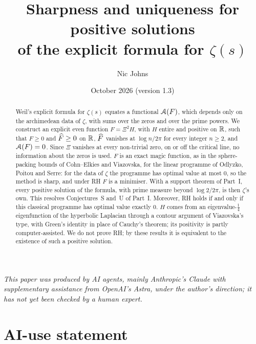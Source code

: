 \documentclass[11pt]{amsart}
\title[Sharpness and uniqueness for the explicit formula]{Sharpness and uniqueness for positive solutions\\ of the explicit formula
for $\zeta(s)$}
\author{Nic Johns}
\date{October 2026 (version 1.3)}
\theoremstyle{definition}
\theoremstyle{remark}
\numberwithin{equation}{section}
\newcommand{\inputsection}[1]{}
\begin{document}
\begin{abstract}
Weil's explicit formula for $\zeta(s)$ equates a functional $\mathcal A(F)$, which depends only on the archimedean data of $\zeta$, with sums over
the zeros and over the prime powers. We construct an explicit even function $F=\Xi^2H$, with $H$ entire and positive on $\mathbb R$, such that
$F\ge0$ and $\widehat F\ge0$ on $\mathbb R$, $\widehat F$ vanishes at $\log n/2\pi$ for every integer $n\ge2$, and $\mathcal A(F)=0$. Since $\Xi$ vanishes at every
non-trivial zero, on or off the critical line, no information about the zeros is used. $F$ is an exact magic function, as in the
sphere-packing bounds of Cohn--Elkies and Viazovska, for the linear programme of Odlyzko, Poitou and Serre: for the data of $\zeta$ the
programme has optimal value at most $0$, so the method is sharp, and under RH $F$ is a minimiser. With a support theorem of Part~I, every
positive solution of the formula, with prime measure beyond $\log2/2\pi$, is then $\zeta$'s own. This resolves Conjectures~S and~U of
Part~I. Moreover, RH holds if and only if this classical programme has optimal value exactly $0$. $H$ comes from an eigenvalue-$\frac14$
eigenfunction of the hyperbolic Laplacian through a contour argument of Viazovska's type, with Green's identity in place of Cauchy's theorem;
its positivity is partly computer-assisted. We do not prove RH; by these results it is equivalent to the existence of such a positive
solution.
\end{abstract}

\maketitle

\begin{center}
\begin{minipage}{0.86\textwidth}
\small\itshape This paper was produced by AI agents, mainly Anthropic's Claude with supplementary assistance from OpenAI's Astra, under the
author's direction; it has not yet been checked by a human expert.
\end{minipage}
\end{center}

\setcounter{tocdepth}{1}
\tableofcontents

\inputsection{01-intro}
\inputsection{02-setting}
\inputsection{03-reduction}
\inputsection{04-automorphic}
\inputsection{05-lift}
\inputsection{06-fourier}
\inputsection{07-physical}
\inputsection{08-assembly}
\inputsection{09-remarks}

\section*{AI-use statement}
\inputsection{ai-statement}

\appendix
\inputsection{A-certificates}
\inputsection{B-bessel}
\inputsection{C-gap}



\end{document}
